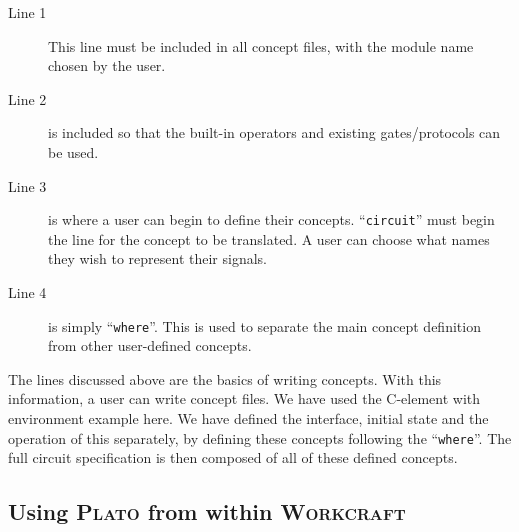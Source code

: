 \documentclass[british,conference,compsoc]{IEEEtran}
\newcommand{\noun}[1]{\textsc{#1}}
\begin{document}
\vspace{-1.5mm}

\begin{description}
  \item [Line 1]  This line must be included in all concept files, with the 
  module name chosen by the user.
  
  \item [Line 2] is included so that the built-in operators and existing 
  gates/protocols can be used. 
  
  \item [Line 3] is where a user can begin to define their concepts. 
  ``\texttt{circuit}'' must begin the line for the concept to be translated.
  A user can choose what names they wish to represent their signals.
  
  \item [Line 4] is simply ``\texttt{where}''. This is used to separate the main
  concept definition from other user-defined concepts.

\end{description}

\vspace{-1mm}

The lines discussed above are the basics of writing concepts. With this 
information, a user can write concept files. We have used the 
C-element with environment example here. We have defined the interface, initial 
state and the operation of this separately, by defining these concepts following the 
``\texttt{where}''. The full circuit specification is then 
composed of all of these defined concepts. 

\vspace{-2.5mm}

\subsection{Using \noun{Plato} from within \noun{Workcraft} \label{sec:workcraft_usage}}

\vspace{-3mm}
\end{document}

